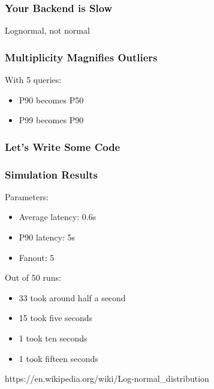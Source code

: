 \begin{frame}
\frametitle{Your Backend is Slow}

Lognormal, not normal

\end{frame}

\begin{frame}
\frametitle{Multiplicity Magnifies Outliers}

With 5 queries:

\begin{itemize}
\item P90 becomes P50
\item P99 becomes P90
\end{itemize}

\end{frame}

\begin{frame}
\frametitle{Let's Write Some Code}



\end{frame}

\begin{frame}
\frametitle{Simulation Results}

Parameters:
\begin{itemize}
\item Average latency: 0.6s
\item P90 latency: 5s
\item Fanout: 5
\end{itemize}

Out of 50 runs:

\begin{itemize}
\item 33 took around half a second
\item 15 took five seconds
\item 1 took ten seconds
\item 1 took fifteen seconds
\end{itemize}
\end{frame}

https://en.wikipedia.org/wiki/Log-normal_distribution


